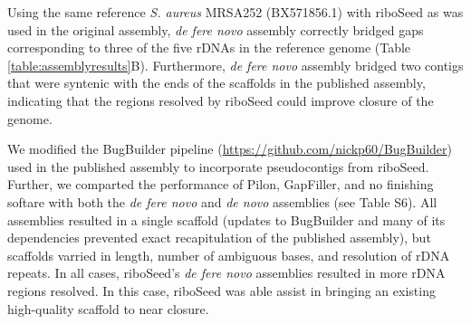 \documentclass[a4,center,fleqn]{NAR}
\begin{document}

Using the same reference \textit{S. aureus} MRSA252\cite{Holden2004} (BX571856.1) with riboSeed as was used in the original assembly, \textit{de fere novo} assembly correctly bridged gaps corresponding to three of the five rDNAs in the reference genome (Table \ref{table:assemblyresults}B). Furthermore, \textit{de fere novo} assembly bridged two contigs that were syntenic with the ends of the scaffolds in the published assembly, indicating that the regions resolved by riboSeed could improve closure of the genome.

We modified the BugBuilder pipeline (\url{https://github.com/nickp60/BugBuilder}\cite{Abbott2017}) used in the published assembly to incorporate pseudocontigs from riboSeed. Further, we comparted the performance of Pilon, GapFiller, and no finishing softare with both the \textit{de fere novo} and \textit{de novo} assemblies (see Table S6). All assemblies resulted in a single scaffold (updates to BugBuilder and many of its dependencies prevented exact recapitulation of the published assembly), but scaffolds varried in length, number of ambiguous bases, and resolution of rDNA repeats. In all cases, riboSeed's \textit{de fere novo} assemblies resulted in more rDNA regions resolved. In this case, riboSeed was able assist in bringing an existing high-quality scaffold to near closure.
\end{document}

